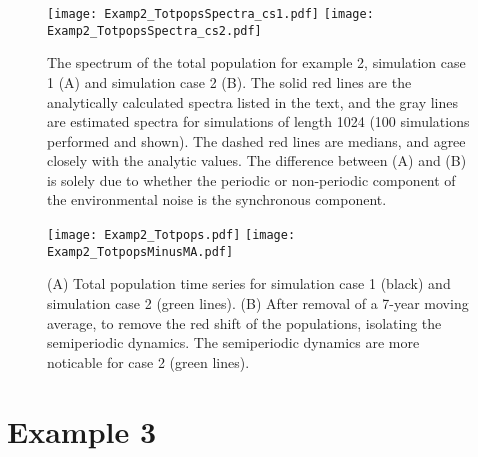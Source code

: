 \documentclass[letterpaper,11pt]{article}
\begin{document}
\begin{figure}
\texttt{[image: Examp2\_TotpopsSpectra\_cs1.pdf]}
\texttt{[image: Examp2\_TotpopsSpectra\_cs2.pdf]}
\caption{The spectrum of the total population for example 2, simulation case 1 (A) and simulation case 2 (B). The solid red lines are the analytically calculated spectra listed in the text, and the gray lines are estimated spectra for simulations of length 1024 (100 simulations performed and shown). The dashed red lines are medians, and agree closely with the analytic values. The difference between (A) and (B) is solely due to whether the periodic or non-periodic component of the environmental noise is the synchronous component.}\label{fig:example2_totpopspec}
\end{figure}

\begin{figure}
\texttt{[image: Examp2\_Totpops.pdf]}
\texttt{[image: Examp2\_TotpopsMinusMA.pdf]}
\caption{(A) Total population time series for simulation case 1 (black) and simulation case 2 (green lines). (B) After removal of a 7-year moving average, to remove the red
shift of the populations, isolating the semiperiodic dynamics. The semiperiodic dynamics
are more noticable for case 2 (green lines). }\label{fig:example2_popts}
\end{figure}

\section{Example 3}\label{sec:example3}
\end{document}
